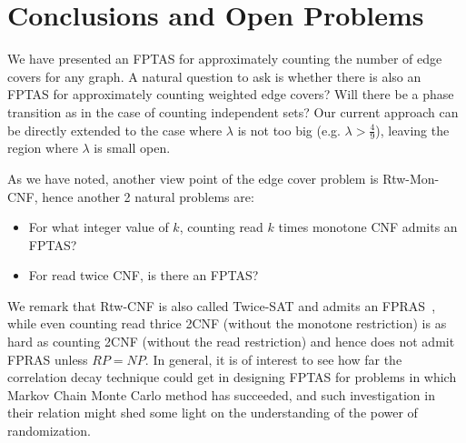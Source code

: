 \section{Conclusions and Open Problems}
We have presented an FPTAS for approximately counting the number of edge covers for any graph. A natural question to ask is whether there is also an FPTAS for approximately counting weighted edge covers? Will there be a phase transition as in the case of counting independent sets? Our current approach can be directly extended to the case where $\lambda$ is not too big (e.g. $\lambda > \frac{4}{9}$), leaving the region where $\lambda$ is small open.

As we have noted, another view point of the edge cover problem is Rtw-Mon-CNF, hence another 2 natural problems are:
\begin{itemize}
	\item For what integer value of $k$, counting read $k$ times monotone CNF admits an FPTAS?
	\item For read twice CNF, is there an FPTAS?
\end{itemize}
We remark that Rtw-CNF is also called Twice-SAT and admits an FPRAS~\cite{TwiceSAT}, while even counting read thrice 2CNF (without the monotone restriction) is as hard as counting 2CNF (without the read restriction) and hence does not admit FPRAS unless $RP=NP$.
In general, it is of interest to see how far the correlation decay technique could get in designing FPTAS for problems in which Markov Chain Monte Carlo method has succeeded, and such investigation in their relation might shed some light on the understanding of the power of randomization.
